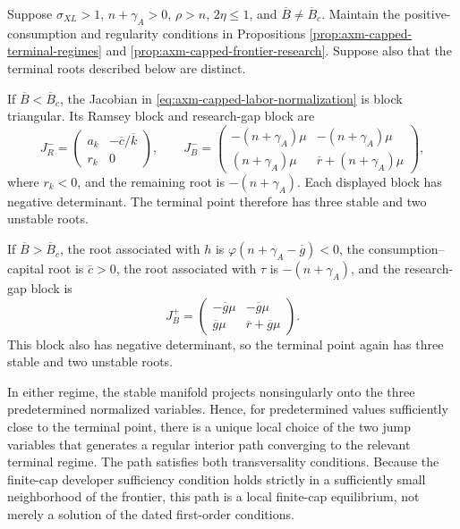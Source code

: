 \begin{proposition}
\label{prop:axm-capped-local-equilibrium}
Suppose \(\sigma_{XL}>1\), \(n+\gamma_A>0\), \(\rho>n\),
\(2\eta\leq1\), and
\(\overline B\neq\overline B_c\). Maintain the positive-consumption and
regularity conditions in Propositions
\ref{prop:axm-capped-terminal-regimes} and
\ref{prop:axm-capped-frontier-research}. Suppose also that the terminal roots
described below are distinct.

If \(\overline B<\overline B_c\), the Jacobian in
\eqref{eq:axm-capped-labor-normalization} is block triangular. Its Ramsey block
and research-gap block are
\begin{equation}
 J_R^-=
 \begin{pmatrix}
  a_k&-\overline c/\overline k\\
  r_k&0
 \end{pmatrix},
 \qquad
 J_B^-=
 \begin{pmatrix}
  -(n+\gamma_A)\mu&-(n+\gamma_A)\mu\\
  (n+\gamma_A)\mu&\overline r+(n+\gamma_A)\mu
 \end{pmatrix},
 \label{eq:axm-capped-labor-jacobian-blocks}
\end{equation}
where \(r_k<0\), and the remaining root is \(-(n+\gamma_A)\). Each displayed block has
negative determinant. The terminal point therefore has three stable and two
unstable roots.

If \(\overline B>\overline B_c\), the root associated with \(h\) is
\(\varphi(n+\gamma_A-\overline g)<0\), the consumption--capital root is
\(\overline c>0\), the root associated with \(\tau\) is
\(-(n+\gamma_A)\), and the
research-gap block is
\begin{equation}
 J_B^+=
 \begin{pmatrix}
  -\overline g\mu&-\overline g\mu\\
  \overline g\mu&\overline r+\overline g\mu
 \end{pmatrix}.
 \label{eq:axm-capped-ai-jacobian-block}
\end{equation}
This block also has negative determinant, so the terminal point again has
three stable and two unstable roots.

In either regime, the stable manifold projects nonsingularly onto the three
predetermined normalized variables. Hence, for predetermined values
sufficiently close to the terminal point, there is a unique local choice of
the two jump variables that generates a regular interior path converging to
the relevant terminal regime. The path satisfies both transversality
conditions. Because the finite-cap developer sufficiency condition holds
strictly in a sufficiently small neighborhood of the frontier, this path is a
local finite-cap equilibrium, not merely a solution of the dated first-order
conditions.
\end{proposition}

